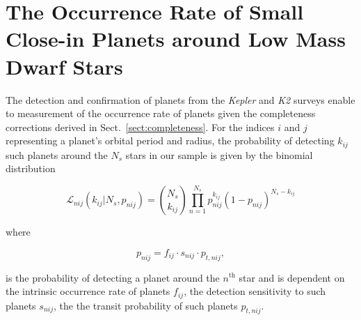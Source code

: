 \documentclass[modern]{aastex63}
\newcommand\kepler{\emph{Kepler}}
\newcommand\ktwo{\emph{K2}}
\begin{document}
\section{The Occurrence Rate of Small Close-in Planets around Low Mass Dwarf Stars} \label{sect:occurrence}
The detection and confirmation of planets from the \kepler{} and \ktwo{} surveys enable to measurement of the
occurrence rate of planets given the completeness corrections derived in Sect.~\ref{sect:completeness}.
For the indices $i$ and $j$ representing a planet's orbital period and radius, the probability of detecting
$k_{ij}$ such planets around the $N_s$ stars in our sample is given by the binomial distribution

\begin{equation}
  \mathcal{L}_{nij}(k_{ij}|N_s,p_{nij}) = \binom{N_s}{k_{ij}} \prod_{n=1}^{N_s} p_{nij}^{k_{ij}} (1-p_{nij})^{N_s-k_{ij}} 
\end{equation}

\noindent where

\begin{equation}
  p_{nij} = f_{ij} \cdot s_{nij} \cdot p_{t,nij},
\end{equation}

\noindent is the probability of detecting a planet around the $n^{\text{th}}$ star and is dependent on the
intrinsic occurrence rate of planets $f_{ij}$, the detection sensitivity to such planets $s_{nij}$, the
the transit probability of such planets $p_{t,nij}$.




\begin{figure*}
  \centering
  \caption{Planet occurrence rate versus orbital period and planetary radius.}
  \label{fig:fmap}
\end{figure*}
  
\begin{figure*}
  \centering
  \caption{Occurrence rate of planets as a function of size. Histogram depicting the relative occurrence
    rate of close-in planets---with orbital periods $<100$ days---derived from the joint sample of confirmed
    planets from \kepler{} and \ktwo{} around low mass stars. The bimodal distribution of planet radii peaking
    at 1.15 and 2.0 R$_{\oplus}$ is resolved which highlights the presence of the radius valley at 1.6 R$_{\oplus}$.
    Uncertainties in the planet occurrences follow from binomial statistics and are limited by the relatively small
    number of confirmed planets around low mass stars from \kepler{} and \ktwo{.}}
  \label{fig:rphist}
\end{figure*}
\end{document}
